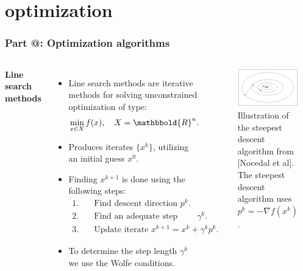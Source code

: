 \documentclass[9pt]{beamer}
\makeatletter
\newcommand*{\rom}[1]{\expandafter\@slowromancap\romannumeral #1@}
\makeatother
\begin{document}
\section{optimization}
\begin{frame}
\frametitle{\textbf{ Part \rom{2}:} Optimization algorithms}
\begin{columns}
\textbf{Line search methods}
\begin{itemize}
\item{Line search methods are iterative methods for solving unconstrained optimization of type:
\begin{align*}
\min_{x\in X}f(x), \quad X=\mathbbold{R}^n.
\end{align*}}
\item{Produces iterates $\{x^k\}$, utilizing an initial guess $x^0$.}
\item{Finding $x^{k+1}$ is done using the following steps: {\small
\begin{align*}
1.\quad& \textrm{Find descent direction $p^k$.}\\
2.\quad& \textrm{Find an adequate step length $\gamma^k$.}\\
3.\quad& \textrm{Update iterate $x^{k+1} = x^k +\gamma^k p^k$.}
\end{align*}
}%
}
\item{To determine the step length $\gamma^k$ we use the Wolfe conditions.}
\end{itemize}
\begin{figure}[!h]
\centering
\includegraphics[scale=0.3,angle=90]{SD.png}
\caption{Illustration of the steepest descent algorithm from [Nocedal et al]. The steepest descent algorithm uses $p^k=-\nabla f(x^k)$.}
\end{figure}
\end{columns}
\end{frame}
\end{document}

